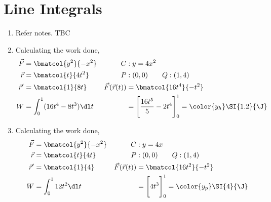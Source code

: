 \section{Line Integrals}

\begin{enumerate}
    \item Refer notes. TBC

    \item Calculating the work done,
          \begin{align}
              \vec{F}             & = \bmatcol{y^2}{-x^2}                      &
              C                   & : y = 4x^2                                   \\
              \vec{r}             & = \bmatcol{t}{4t^2}                        &
              P                   & : (0, 0) \qquad Q : ( 1, 4)                  \\
              \vec{r}'            & = \bmatcol{1}{8t}                          &
              \vec{F}(\vec{r}(t)) & = \bmatcol{16t^4}{-t^2}                      \\
              W                   & = \int_{0}^{1} (16t^4 - 8t^3) \dl t        &
                                  & = \Bigg[ \frac{16t^5}{5} - 2t^4 \Bigg]_0^1
              = \color{y_h} \SI{1.2}{\J}
          \end{align}

    \item Calculating the work done,
          \begin{align}
              \vec{F}             & = \bmatcol{y^2}{-x^2}       &
              C                   & : y = 4x                      \\
              \vec{r}             & = \bmatcol{t}{4t}           &
              P                   & : (0, 0) \qquad Q : ( 1, 4)   \\
              \vec{r}'            & = \bmatcol{1}{4}            &
              \vec{F}(\vec{r}(t)) & = \bmatcol{16t^2}{-t^2}       \\
              W                   & = \int_{0}^{1} 12t^2 \dl t  &
                                  & = \Bigg[ 4t^3 \Bigg]_0^1
              = \color{y_p} \SI{4}{\J}
          \end{align}


\end{enumerate}
